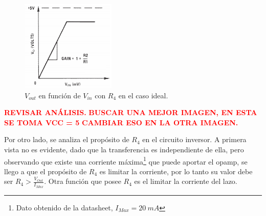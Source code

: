 \begin{figure}[H]	
	\centering
	\includegraphics[width=0.4\textwidth]{Ejercicio1/Imagenes/VinvsVoR3.png}
	\caption{$V_{out}$ en función de $V_{in}$ con $R_4$ en el caso ideal.}
	\label{fig:VinvsVoR3}
\end{figure} 

\begin{center}
\textcolor{red}{\textbf{REVISAR ANÁLISIS.}}
\textcolor{red}{\textbf{BUSCAR UNA MEJOR IMAGEN, EN ESTA SE TOMA VCC = 5}}
\textcolor{red}{\textbf{CAMBIAR ESO EN LA OTRA IMAGEN.}}
\end{center}

Por otro lado, se analiza el propósito de $R_4$ en el circuito inversor. A primera vista no es evidente, dado que la transferencia es independiente de ella, pero observando que existe una corriente máxima\footnote{Dato obtenido de la datasheet, $I_{Max}=20 \ mA$} que puede aportar el opamp, se llego a que el propósito de $R_4$ es limitar la corriente, por lo tanto su valor debe ser $R_4>\frac{V_{Out}}{I_{Max}}$. Otra función que posee $R_4$ es el limitar la corriente del lazo.

